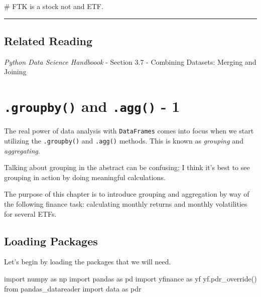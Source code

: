 \documentclass[
  letterpaper,
  DIV=11,
  numbers=noendperiod]{scrreprt}
\newenvironment{Shaded}{\begin{snugshade}}{\end{snugshade}}
\newcommand{\CommentTok}[1]{\textcolor[rgb]{0.37,0.37,0.37}{#1}}
\newcommand{\ImportTok}[1]{\textcolor[rgb]{0.00,0.46,0.62}{#1}}
\newcommand{\NormalTok}[1]{\textcolor[rgb]{0.00,0.23,0.31}{#1}}
\begin{document}
\begin{Shaded}
\begin{Highlighting}[]
\CommentTok{\# FTK is a stock not and ETF.}
\end{Highlighting}
\end{Shaded}

\begin{center}\rule{0.5\linewidth}{0.5pt}\end{center}

\hypertarget{related-reading-4}{%
\section{Related Reading}\label{related-reading-4}}

\emph{Python Data Science Handboook} - Section 3.7 - Combining Datasets:
Merging and Joining

\hypertarget{groupby-and-.agg---1}{%
\chapter{\texorpdfstring{\texttt{.groupby()} and \texttt{.agg()} -
1}{.groupby() and .agg() - 1}}\label{groupby-and-.agg---1}}

The real power of data analysis with \texttt{DataFrames} comes into
focus when we start utilizing the \texttt{.groupby()} and
\texttt{.agg()} methods. This is known as \emph{grouping} and
\emph{aggregating}.

Talking about grouping in the abstract can be confusing; I think it's
best to see grouping in action by doing meaningful calculations.

The purpose of this chapter is to introduce grouping and aggregation by
way of the following finance task: calculating monthly returns and
monthly volatilities for several ETFs.

\hypertarget{loading-packages-2}{%
\section{Loading Packages}\label{loading-packages-2}}

Let's begin by loading the packages that we will need.

\begin{Shaded}
\begin{Highlighting}[]
\ImportTok{import}\NormalTok{ numpy }\ImportTok{as}\NormalTok{ np}
\ImportTok{import}\NormalTok{ pandas }\ImportTok{as}\NormalTok{ pd}
\ImportTok{import}\NormalTok{ yfinance }\ImportTok{as}\NormalTok{ yf}
\NormalTok{yf.pdr\_override()}
\ImportTok{from}\NormalTok{ pandas\_datareader }\ImportTok{import}\NormalTok{ data }\ImportTok{as}\NormalTok{ pdr}
\end{Highlighting}
\end{Shaded}
\end{document}
